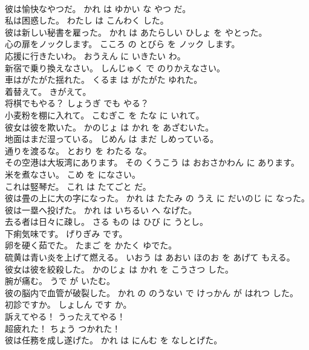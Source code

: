 \documentclass[8pt]{extreport}
\begin{document}
\begin{CJK}{UTF8}{min}
\\	彼は愉快なやつだ。	かれ は ゆかい な やつ だ。	
\\	私は困惑した。	わたし は こんわく した。	
\\	彼は新しい秘書を雇った。	かれ は あたらしい ひしょ を やとった。	
\\	心の扉をノックします。	こころ の とびら を ノック します。	
\\	応援に行きたいわ。	おうえん に いきたい わ。	
\\	新宿で乗り換えなさい。	しんじゅく で のりかえなさい。	
\\	車はがたがた揺れた。	くるま は がたがた ゆれた。	
\\	着替えて。	きがえて。	
\\	将棋でもやる？	しょうぎ でも やる？	
\\	小麦粉を棚に入れて。	こむぎこ を たな に いれて。	
\\	彼女は彼を欺いた。	かのじょ は かれ を あざむいた。	
\\	地面はまだ湿っている。	じめん は まだ しめっている。	
\\	通りを渡るな。	とおり を わたる な。	
\\	その空港は大坂湾にあります。	その くうこう は おおさかわん に あります。	
\\	米を煮なさい。	こめ を になさい。	
\\	これは竪琴だ。	これ は たてごと だ。	
\\	彼は畳の上に大の字になった。	かれ は たたみ の うえ に だいのじ に なった。	
\\	彼は一塁へ投げた。	かれ は いちるい へ なげた。	
\\	去る者は日々に疎し。	さる もの は ひび に うとし。	
\\	下痢気味です。	げりぎみ です。	
\\	卵を硬く茹でた。	たまご を かたく ゆでた。	
\\	硫黄は青い炎を上げて燃える。	いおう は あおい ほのお を あげて もえる。	
\\	彼女は彼を絞殺した。	かのじょ は かれ を こうさつ した。	
\\	腕が痛む。	うで が いたむ。	
\\	彼の脳内で血管が破裂した。	かれ の のうない で けっかん が はれつ した。	
\\	初診ですか。	しょしん です か。	
\\	訴えてやる！	うったえてやる！	
\\	超疲れた！	ちょう つかれた！	
\\	彼は任務を成し遂げた。	かれ は にんむ を なしとげた。	

\end{CJK}
\end{document}
